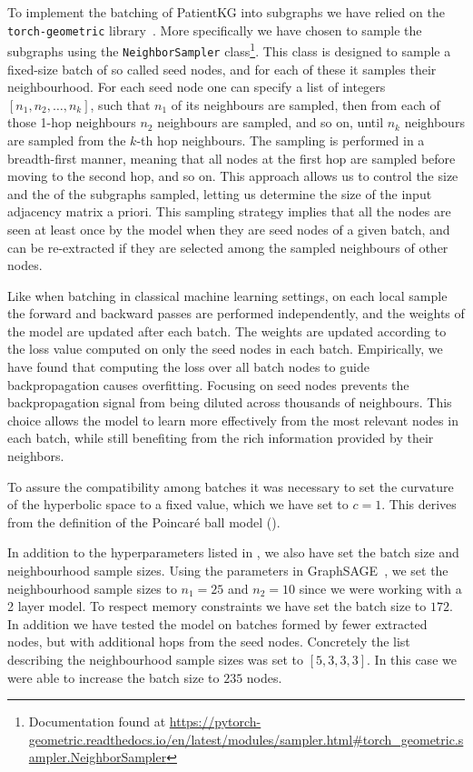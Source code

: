 To implement the batching of PatientKG into subgraphs we have relied on the \texttt{torch-geometric} library~\cite{fey2019pytorchGeometric}. More specifically we have chosen to sample the subgraphs using the \texttt{NeighborSampler} class\footnote{Documentation found at \url{https://pytorch-geometric.readthedocs.io/en/latest/modules/sampler.html\#torch\_geometric.sampler.NeighborSampler}}. This class is designed to sample a fixed-size batch of so called seed nodes, and for each of these it samples their neighbourhood. For each seed node one can specify a list of integers $[n_1, n_2, \dots, n_k]$, such that $n_1$ of its neighbours are sampled, then from each of those 1-hop neighbours $n_2$ neighbours are sampled, and so on, until $n_k$ neighbours are sampled from the $k$-th hop neighbours. The sampling is performed in a breadth-first manner, meaning that all nodes at the first hop are sampled before moving to the second hop, and so on. This approach allows us to control the size and the of the subgraphs sampled, letting us determine the size of the input adjacency matrix a priori. This sampling strategy implies that all the nodes are seen at least once by the model when they are seed nodes of a given batch, and can be re-extracted if they are selected among the sampled neighbours of other nodes. 

Like when batching in classical machine learning settings, on each local sample the forward and backward passes are performed independently, and the weights of the model are updated after each batch. The weights are updated according to the loss value computed on only the seed nodes in each batch. Empirically, we have found that computing the loss over all batch nodes to guide backpropagation causes overfitting. Focusing on seed nodes prevents the backpropagation signal from being diluted across thousands of neighbours. This choice allows the model to learn more effectively from the most relevant nodes in each batch, while still benefiting from the rich information provided by their neighbors.


To assure the compatibility among batches it was necessary to set the curvature of the hyperbolic space to a fixed value, which we have set to $c=1$. This derives from the definition of the Poincaré ball model ().

\medskip 

In addition to the hyperparameters listed in , we also have set the batch size and neighbourhood sample sizes. Using the parameters in GraphSAGE~\cite{Hamilton2017inductiveRepresentationLearning}, we set the neighbourhood sample sizes to $n_1=25$ and $n_2=10$ since we were working with a 2 layer model. To respect memory constraints we have set the batch size to $172$. In addition we have tested the model on batches formed by fewer extracted nodes, but with additional hops from the seed nodes. Concretely the list describing the neighbourhood sample sizes was set to $[5,3,3,3]$. In this case we were able to increase the batch size to $235$ nodes.

